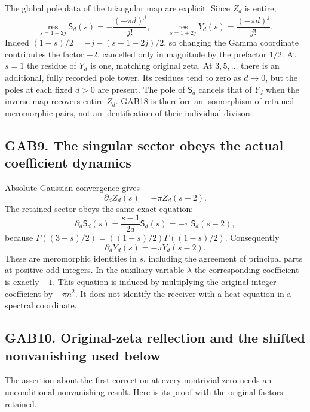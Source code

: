 \documentclass[
  10pt,
  a4paper,
]{article}
\begin{document}
The global pole data of the triangular map are explicit. Since \(Z_d\)
is entire, \[
 \operatorname*{res}_{s=1+2j}\mathsf S_d(s)
       =-\frac{(-\pi d)^j}{j!},\qquad
 \operatorname*{res}_{s=1+2j}Y_d(s)
       =\frac{(-\pi d)^j}{j!}.                         \tag{GAB21}
\] Indeed \((1-s)/2=-j-(s-1-2j)/2\), so changing the Gamma coordinate
contributes the factor \(-2\), cancelled only in magnitude by the
prefactor \(1/2\). At \(s=1\) the residue of \(Y_d\) is one, matching
original zeta. At \(3,5,\ldots\) there is an additional, fully recorded
pole tower. Its residues tend to zero as \(d\to0\), but the poles at
each fixed \(d>0\) are present. The pole of \(\mathsf S_d\) cancels that
of \(Y_d\) when the inverse map recovers entire \(Z_d\). GAB18 is
therefore an isomorphism of retained meromorphic pairs, not an
identification of their individual divisors.

\subsection{GAB9. The singular sector obeys the actual coefficient
dynamics}\label{gab9.-the-singular-sector-obeys-the-actual-coefficient-dynamics}

Absolute Gaussian convergence gives \[
 \partial_d Z_d(s)=-\pi Z_d(s-2).
\] The retained sector obeys the same exact equation: \[
 \partial_d\mathsf S_d(s)
   =\frac{s-1}{2d}\mathsf S_d(s)
   =-\pi\,\mathsf S_d(s-2),
\] because \(\Gamma((3-s)/2)=((1-s)/2)\Gamma((1-s)/2)\). Consequently \[
 \boxed{\partial_d Y_d(s)=-\pi Y_d(s-2)}.                \tag{GAB22}
\] These are meromorphic identities in \(s\), including the agreement of
principal parts at positive odd integers. In the auxiliary variable
\(\lambda\) the corresponding coefficient is exactly \(-1\). This
equation is induced by multiplying the original integer coefficient by
\(-\pi n^2\). It does not identify the receiver with a heat equation in
a spectral coordinate.

\subsection{GAB10. Original-zeta reflection and the shifted nonvanishing
used
below}\label{gab10.-original-zeta-reflection-and-the-shifted-nonvanishing-used-below}

The assertion about the first correction at every nontrivial zero needs
an unconditional nonvanishing result. Here is its proof with the
original factors retained.
\end{document}

